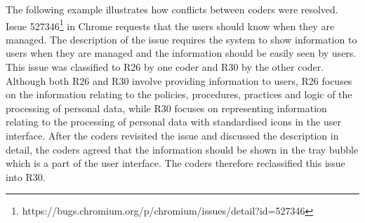The following example illustrates how conflicts between coders were resolved. Issue 527346\footnote{https://bugs.chromium.org/p/chromium/issues/detail?id=527346} in Chrome requests that the users should know when they are managed. The description of the issue requires the system to show information to users when they are managed and the information should be easily seen by users. This issue was classified to R26 by one coder and R30 by the other coder. Although both R26 and R30 involve providing information to users, R26 focuses on the information relating to the policies, procedures, practices and logic of the processing of personal data, while R30 focuses on representing information relating to the processing of personal data with standardised icons in the user interface. After the coders revisited the issue and discussed the description in detail, the coders agreed that the information should be shown in the tray bubble which is a part of the user interface. The coders therefore reclassified this issue into R30.



